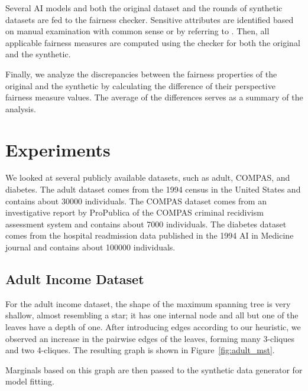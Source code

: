 \documentclass[manuscript,screen,review,anonymous]{acmart}
\begin{document}
Several AI models and both the original dataset and the rounds of synthetic datasets are fed to the fairness checker. Sensitive attributes are identified based on manual examination with common sense or by referring to \cite{pessach2022review}. Then, all applicable fairness measures are computed using the checker for both the original and the synthetic.

Finally, we analyze the discrepancies between the fairness properties of the original and the synthetic by calculating the difference of their perspective fairness measure values. The average of the differences serves as a summary of the analysis.

\section{Experiments}

We looked at several publicly available datasets, such as adult\cite{adult_2,Kaggle_Adult_Census_Income}, COMPAS\cite{larson2016propublica,Kaggle_COMPAS_Dataset}, and diabetes\cite{diabetes_34,Kaggle_Diabetes_Prediction}. The adult dataset comes from the 1994 census in the United States and contains about 30000 individuals. The COMPAS dataset comes from an investigative report by ProPublica of the COMPAS criminal recidivism assessment system and contains about 7000 individuals. The diabetes dataset comes from the hospital readmission data published in the 1994 AI in Medicine journal and contains about 100000 individuals.

\subsection{Adult Income Dataset}

For the adult income dataset, the shape of the maximum spanning tree is very shallow, almost resembling a star; it has one internal node and all but one of the leaves have a depth of one. After introducing edges according to our heuristic, we observed an increase in the pairwise edges of the leaves, forming many 3-cliques and two 4-cliques. The resulting graph is shown in Figure~\ref{fig:adult_mst}.

Marginals based on this graph are then passed to the synthetic data generator for model fitting.
\end{document}
